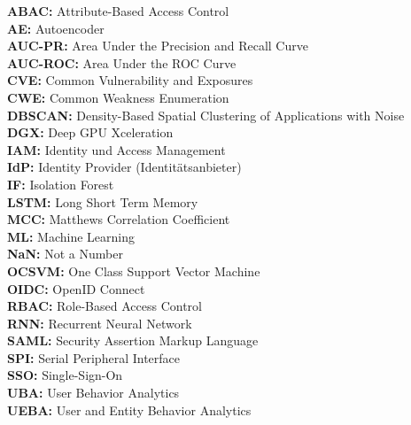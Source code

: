 \documentclass[a4paper,12pt]{article}
\begin{document}
	\textbf{ABAC:} Attribute-Based Access Control \\[1em]
	\textbf{AE:} Autoencoder \\[1em]
	\textbf{AUC-PR:} Area Under the Precision and Recall Curve \\[1em]
	\textbf{AUC-ROC:} Area Under the ROC Curve \\[1em]
	\textbf{CVE:} Common Vulnerability and Exposures \\[1em]
	\textbf{CWE:} Common Weakness Enumeration \\[1em]
	\textbf{DBSCAN:} Density-Based Spatial Clustering of Applications with Noise \\[1em]
	\textbf{DGX:} Deep GPU Xceleration \\[1em]
	\textbf{IAM:} Identity und Access Management \\[1em]
	\textbf{IdP:} Identity Provider (Identitätsanbieter) \\[1em]
	\textbf{IF:} Isolation Forest \\[1em]
	\textbf{LSTM:} Long Short Term Memory \\[1em]
	\textbf{MCC:} Matthews Correlation Coefficient \\[1em]
	\textbf{ML:} Machine Learning \\[1em]
	\textbf{NaN:} Not a Number \\[1em]
	\textbf{OCSVM:} One Class Support Vector Machine \\[1em]
	\textbf{OIDC:} OpenID Connect \\[1em]
	\textbf{RBAC:} Role-Based Access Control \\[1em]
	\textbf{RNN:} Recurrent Neural Network \\[1em]
	\textbf{SAML:} Security Assertion Markup Language \\[1em]
	\textbf {SPI:} Serial Peripheral Interface \\[1em]
	\textbf{SSO:} Single-Sign-On \\[1em]
	\textbf {UBA:} User Behavior Analytics \\[1em]
	\textbf {UEBA:} User and Entity Behavior Analytics \\[1em]

	\newpage
	
	
	
\end{document}
